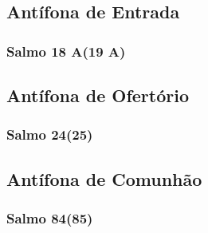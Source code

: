 \subsection{Antífona de Entrada}


\subsubsection{Salmo 18 A(19 A)}


\subsection{Antífona de Ofertório}


\subsubsection{Salmo 24(25)}


\subsection{Antífona de Comunhão}


\subsubsection{Salmo 84(85)}
